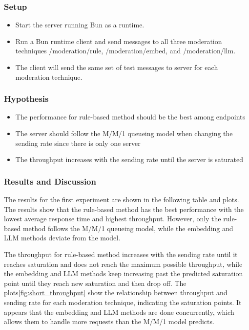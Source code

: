 \documentclass[
	english,
	accentcolor=9c,
	type=intern,
	marginpar=false,
	11pt
]{tudapub}
\begin{document}
\subsubsection{Setup}
\begin{itemize}
    \item Start the server running Bun as a runtime.
    \item Run a Bun runtime client and send messages to all three moderation techniques /moderation/rule, /moderation/embed, and /moderation/llm.
    \item The client will send the same set of test messages to server for each moderation technique.
\end{itemize}

\subsubsection{Hypothesis}
\begin{itemize}
    \item The performance for rule-based method should be the best among endpoints
    \item The server should follow the M/M/1 queueing model when changing the sending rate since there is only one server
    \item The throughput increases with the sending rate until the server is saturated
\end{itemize}

\subsubsection{Results and Discussion}
The results for the first experiment are shown in the following table and plots.
The results show that the rule-based method has the best performance with the lowest average response time and highest throughput.
However, only the rule-based method follows the M/M/1 queueing model, while the embedding and LLM methods deviate from the model.

The throughput for rule-based method increases with the sending rate until it reaches saturation and does not reach the maximum possible throughput, while the embedding and LLM methods keep increasing past the predicted saturation point until they reach new saturation and then drop off.
The plots\ref{fig:short_throughput} show the relationship between throughput and sending rate for each moderation technique, indicating the saturation points.
It appears that the embedding and LLM methods are done concurrently, which allows them to handle more requests than the M/M/1 model predicts.
\end{document}

